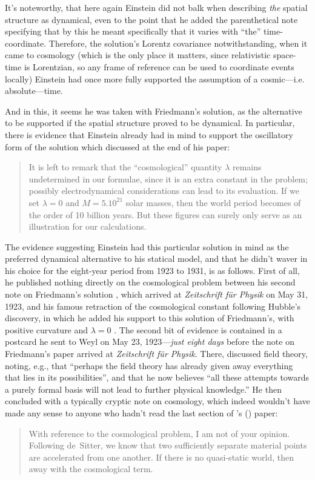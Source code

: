 \documentclass[12 pt]{article}
\def\citeapos#1{\citeauthor{#1}'s (\citeyear{#1})}
\begin{document}
It's noteworthy, that here again Einstein did not balk when describing \textit{the} spatial structure as dynamical, even to the point that he added the parenthetical note specifying that by this he meant specifically that it varies with ``the'' time-coordinate. Therefore, the solution's Lorentz covariance notwithstanding, when it came to cosmology (which is the only place it matters, since relativistic space-time is Lorentzian, so any frame of reference can be used to coordinate events locally) Einstein had once more fully supported the assumption of a cosmic---i.e. absolute---time.

And in this, it seems he was taken with Friedmann's solution, as the alternative to be supported if the spatial structure proved to be dynamical. In particular, there is evidence that Einstein already had in mind to support the oscillatory form of the solution which \citet{Friedmann1922} discussed at the end of his paper:
\begin{quote}
It is left to remark that the ``cosmological'' quantity $\lambda$ remains undetermined in our formulae, since it is an extra constant in the problem; possibly electrodynamical considerations can lead to its evaluation. If we set $\lambda=0$ and $M=5.10^{21}$ solar masses, then the world period becomes of the order of 10 billion years. But these figures can surely only serve as an illustration for our calculations.
\end{quote}

The evidence suggesting Einstein had this particular solution in mind as the preferred dynamical alternative to his statical model, and that he didn't waver in his choice for the eight-year period from 1923 to 1931, is as follows. First of all, he published nothing directly on the cosmological problem between his second note on Friedmann's solution \citep{Einstein1923b}, which arrived at \textit{Zeitschrift f\"{u}r Physik} on May 31, 1923, and his famous retraction of the cosmological constant following Hubble's discovery, in which he added his support to this solution of Friedmann's, with positive curvature and $\lambda=0$ \citep{Einstein1931a}. The second bit of evidence is contained in a postcard he sent to Weyl on May 23, 1923---\textit{just eight days} before the note on Friedmann's paper arrived at \textit{Zeitschrift f\"{u}r Physik}. There, \citet{Einstein1923a} discussed field theory, noting, e.g., that ``perhaps the field theory has already given away everything that lies in its possibilities'', and that he now believes ``all these attempts towards a purely formal basis will not lead to further physical knowledge.'' He then concluded with a typically cryptic note on cosmology, which indeed wouldn't have made any sense to anyone who hadn't read the last section of \citeapos{Friedmann1922} paper: 
\begin{quote}
With reference to the cosmological problem, I am not of your opinion. Following de~Sitter, we know that two sufficiently separate material points are accelerated from one another. If there is no quasi-static world, then away with the cosmological term.
\end{quote}
\end{document}
